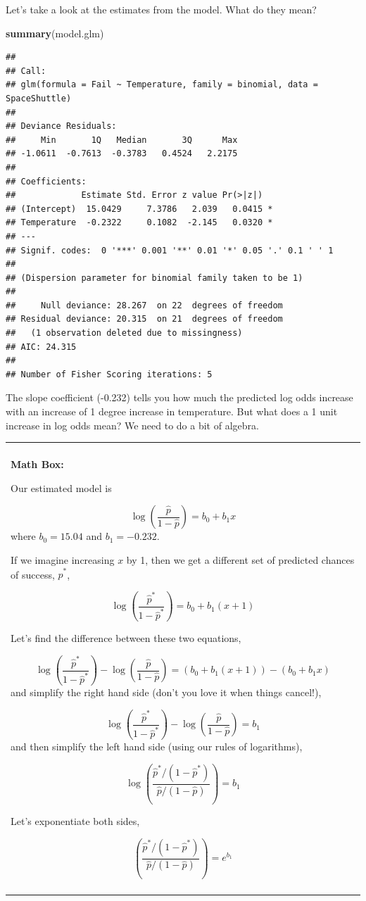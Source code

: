 \documentclass[]{book}
\newenvironment{Shaded}{\begin{snugshade}}{\end{snugshade}}
\newcommand{\KeywordTok}[1]{\textcolor[rgb]{0.13,0.29,0.53}{\textbf{#1}}}
\newcommand{\NormalTok}[1]{#1}
\newenvironment{mathbox}
{
    \begin{center}
    
    \begin{tabular}{|p{0.8\textwidth}|}
    \rowcolor{LightYellow}
    \hline\\
    \rowcolor{LightYellow}
    \textbf{Math Box:}
}
{
    \\\rowcolor{LightYellow}
    \\\hline
    \end{tabular} 
    \end{center}
}
\begin{document}
Let's take a look at the estimates from the model. What do they mean?

\begin{Shaded}
\begin{Highlighting}[]
\KeywordTok{summary}\NormalTok{(model.glm)}
\end{Highlighting}
\end{Shaded}

\begin{verbatim}
## 
## Call:
## glm(formula = Fail ~ Temperature, family = binomial, data = SpaceShuttle)
## 
## Deviance Residuals: 
##     Min       1Q   Median       3Q      Max  
## -1.0611  -0.7613  -0.3783   0.4524   2.2175  
## 
## Coefficients:
##             Estimate Std. Error z value Pr(>|z|)  
## (Intercept)  15.0429     7.3786   2.039   0.0415 *
## Temperature  -0.2322     0.1082  -2.145   0.0320 *
## ---
## Signif. codes:  0 '***' 0.001 '**' 0.01 '*' 0.05 '.' 0.1 ' ' 1
## 
## (Dispersion parameter for binomial family taken to be 1)
## 
##     Null deviance: 28.267  on 22  degrees of freedom
## Residual deviance: 20.315  on 21  degrees of freedom
##   (1 observation deleted due to missingness)
## AIC: 24.315
## 
## Number of Fisher Scoring iterations: 5
\end{verbatim}

The slope coefficient (-0.232) tells you how much the predicted log odds increase with an increase of 1 degree increase in temperature. But what does a 1 unit increase in log odds mean? We need to do a bit of algebra.

\begin{mathbox}
Our estimated model is

\[\log\left(\frac{\hat{p}}{1-\hat{p}}\right) = b_0 +b_1x\] where
\(b_0 = 15.04\) and \(b_1 = -0.232\).

If we imagine increasing \(x\) by 1, then we get a different set of
predicted chances of success, \(\hat{p}^*\),

\[\log\left(\frac{\hat{p}^*}{1-\hat{p}^*}\right) = b_0 +b_1(x+1)\]

Let's find the difference between these two equations,

\[\log\left(\frac{\hat{p}^*}{1-\hat{p}^*}\right) - \log\left(\frac{\hat{p}}{1-\hat{p}}\right) = (b_0 +b_1(x+1)) - (b_0 +b_1x)\]
and simplify the right hand side (don't you love it when things
cancel!),

\[\log\left(\frac{\hat{p}^*}{1-\hat{p}^*}\right) - \log\left(\frac{\hat{p}}{1-\hat{p}}\right) = b_1\]
and then simplify the left hand side (using our rules of logarithms),

\[\log\left( \frac{\hat{p}^*/(1-\hat{p}^*)}{\hat{p}/(1-\hat{p})}\right) = b_1\]

Let's exponentiate both sides,

\[\left( \frac{\hat{p}^*/(1-\hat{p}^*)}{\hat{p}/(1-\hat{p})}\right) = e^{b_1}\]
\end{mathbox}
\end{document}
